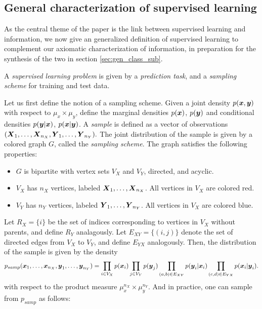 \documentclass[12pt]{article}
\begin{document}
\subsection{General characterization of supervised learning}

As the central theme of the paper is the link between supervised
learning and information, we now give an generalized definition of
supervised learning to complement our axiomatic characterization of
information, in preparation for the synthesis of the two in
section \ref{sec:gen_class_sub}.

A \emph{supervised learning problem} is given by a \emph{prediction
task}, and a \emph{sampling scheme} for training and test data.

Let us first define the notion of a sampling scheme.  Given a joint
density $p(\boldsymbol{x}, \boldsymbol{y})$ with respect to $\mu_x \times \mu_y$, define the marginal densities $p(\boldsymbol{x})$,
$p(\boldsymbol{y})$ and conditional densities $p(\boldsymbol{y}|\boldsymbol{x})$, $p(\boldsymbol{x}|\boldsymbol{y})$.
A \emph{sample} is defined as a vector of observations
$(\boldsymbol{X}_1,\hdots, \boldsymbol{X}_{n_X}, \boldsymbol{Y}_1,\hdots, \boldsymbol{Y}_{n_Y}).$ The joint
distribution of the sample is given by a colored graph $G$,
called the \emph{sampling scheme}.  The graph satisfies the following properties:
\begin{itemize}
\item $G$ is bipartite with vertex sets $V_X$ and $V_Y$, directed, and acyclic.
\item $V_X$ has $n_X$ vertices, labeled $\boldsymbol{X}_1,\hdots, \boldsymbol{X}_{n_X}$.  All vertices in $V_X$ are colored red.
\item $V_Y$ has $n_Y$ vertices, labeled $\boldsymbol{Y}_1,\hdots, \boldsymbol{Y}_{n_Y}$.  All vertices in $V_X$ are colored blue.
\end{itemize}
Let $R_X = \{i\}$ be the set of indices corresponding to vertices in
$V_X$ without parents, and define $R_Y$ analagously.  Let $E_{XY}
= \{(i, j)\}$ denote the set of directed edges from $V_X$ to $V_Y$,
and define $E_{YX}$ analogously.  Then, the distribution of the sample
is given by the density
\[
p_{samp}(\boldsymbol{x}_1,\hdots, \boldsymbol{x}_{n_X}, \boldsymbol{y}_1,\hdots, \boldsymbol{y}_{n_Y}) 
= \prod_{i \in V_X} p(\boldsymbol{x}_i) \prod_{j \in V_Y} p(\boldsymbol{y}_j) \prod_{(a, b) \in E_{XY}} p(\boldsymbol{y}_i|\boldsymbol{x}_i) \prod_{(c,d) \in E_{YX}} p(\boldsymbol{x}_i|\boldsymbol{y}_i).
\]
with respect to the product measure $\mu_x^{n_X} \times \mu_y^{n_Y}.$
And in practice, one can sample from $p_{samp}$ as follows:
\end{document}
